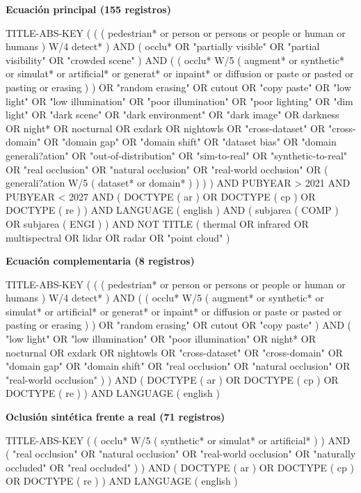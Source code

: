 \documentclass[10pt]{article}
\begin{document}
\noindent\textbf{Ecuación principal (155 registros)}\\
{\ttfamily\footnotesize\raggedright TITLE-ABS-KEY ( ( ( pedestrian* or person or persons or people or human or humans ) W/4 detect* ) AND ( occlu* OR "partially visible" OR "partial visibility" OR "crowded scene" ) AND ( ( occlu* W/5 ( augment* or synthetic* or simulat* or artificial* or generat* or inpaint* or diffusion or paste or pasted or pasting or erasing ) ) OR "random erasing" OR cutout OR "copy paste" OR "low light" OR "low illumination" OR "poor illumination" OR "poor lighting" OR "dim light" OR "dark scene" OR "dark environment" OR "dark image" OR darkness OR night* OR nocturnal OR exdark OR nightowls OR "cross-dataset" OR "cross-domain" OR "domain gap" OR "domain shift" OR "dataset bias" OR "domain generali{?}ation" OR "out-of-distribution" OR "sim-to-real" OR "synthetic-to-real" OR "real occlusion" OR "natural occlusion" OR "real-world occlusion" OR ( generali{?}ation W/5 ( dataset* or domain* ) ) ) ) AND PUBYEAR > 2021 AND PUBYEAR < 2027 AND ( DOCTYPE ( ar ) OR DOCTYPE ( cp ) OR DOCTYPE ( re ) ) AND LANGUAGE ( english ) AND ( subjarea ( COMP ) OR subjarea ( ENGI ) ) AND NOT TITLE ( thermal OR infrared OR multispectral OR lidar OR radar OR "point cloud" )\par}

\noindent\textbf{Ecuación complementaria (8 registros)}\\
{\ttfamily\footnotesize\raggedright TITLE-ABS-KEY ( ( ( pedestrian* or person or persons or people or human or humans ) W/4 detect* ) AND ( ( occlu* W/5 ( augment* or synthetic* or simulat* or artificial* or generat* or inpaint* or diffusion or paste or pasted or pasting or erasing ) ) OR "random erasing" OR cutout OR "copy paste" ) AND ( "low light" OR "low illumination" OR "poor illumination" OR night* OR nocturnal OR exdark OR nightowls OR "cross-dataset" OR "cross-domain" OR "domain gap" OR "domain shift" OR "real occlusion" OR "natural occlusion" OR "real-world occlusion" ) ) AND ( DOCTYPE ( ar ) OR DOCTYPE ( cp ) OR DOCTYPE ( re ) ) AND LANGUAGE ( english )\par}

\noindent\textbf{Oclusión sintética frente a real (71 registros)}\\
{\ttfamily\footnotesize\raggedright TITLE-ABS-KEY ( ( occlu* W/5 ( synthetic* or simulat* or artificial* ) ) AND ( "real occlusion" OR "natural occlusion" OR "real-world occlusion" OR "naturally occluded" OR "real occluded" ) ) AND ( DOCTYPE ( ar ) OR DOCTYPE ( cp ) OR DOCTYPE ( re ) ) AND LANGUAGE ( english )\par}
\end{document}
